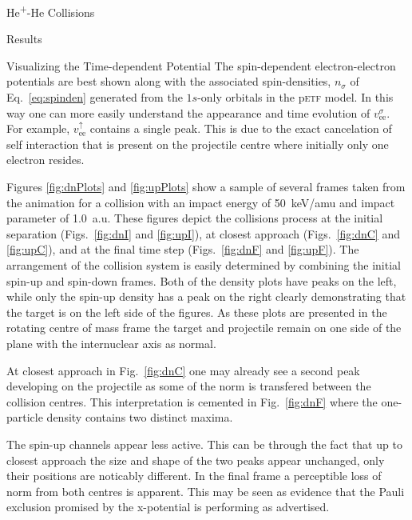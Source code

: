 \documentclass[a5paper, 9 pt]{extreport}
\begin{document}
\begin{chapter}{\texorpdfstring{He\textsuperscript{+}}{He+}-He Collisions \label{chap:hephe}}
\begin{section}{Results \label{sec:hephe-disc}}
\begin{subsection}{Visualizing the Time-dependent Potential \label{sec:visual}}
         The spin-dependent electron-electron potentials are best shown along with the associated
         spin-densities, $n_\sigma$ of Eq.~\eqref{eq:spinden} generated from the $1s$-only orbitals in
         the p\textsc{etf} model. In this way one can more easily understand the appearance and time
         evolution of $v_\mathrm{ee}^\sigma$. For example, $v_\mathrm{ee}^\uparrow$ contains a single
         peak. This is due to the exact cancelation of self interaction that is present on the
         projectile centre where initially only one electron resides.

         Figures \ref{fig:dnPlots} and \ref{fig:upPlots} show a sample of several frames taken from the
         animation for a collision with an impact energy of 50~keV/amu and impact parameter of 1.0~a.u.
         These figures depict the collisions process at the initial separation (Figs.~\ref{fig:dnI} and
         \ref{fig:upI}), at closest approach (Figs.~\ref{fig:dnC} and \ref{fig:upC}), and at the final
         time step (Figs.~\ref{fig:dnF} and \ref{fig:upF}). The arrangement of the collision system is
         easily determined by combining the initial spin-up and spin-down frames. Both of the density
         plots have peaks on the left, while only the spin-up density has a peak on the right clearly
         demonstrating that the target is on the left side of the figures. As these plots are presented
         in the rotating centre of mass frame the target and projectile remain on one side of the plane
         with the internuclear axis as normal.

         At closest approach in Fig.~\ref{fig:dnC} one may already see a
         second peak developing on the projectile as some of the norm is transfered between the
         collision centres. This interpretation is cemented in Fig.~\ref{fig:dnF} where the one-particle
         density contains two distinct maxima.

         The spin-up channels appear less active. This can be through the fact that up to closest
         approach the size and shape of the two peaks appear unchanged, only their positions are
         noticably different. In the final frame a perceptible loss of norm from both centres is
         apparent. This may be seen as evidence that the Pauli exclusion promised by the x-potential is
         performing as advertised.

         \FloatBarrier

      \end{subsection}


\end{section}
\end{chapter}
\end{document}
